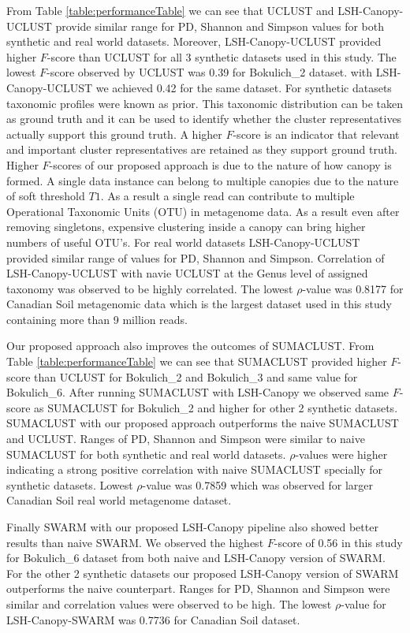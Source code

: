 \documentclass[10pt, conference, compsocconf]{IEEEtran}
\begin{document}
From Table \ref{table:performanceTable} we can see that UCLUST and LSH-Canopy-UCLUST provide similar range for PD, Shannon and Simpson values for both synthetic and real world datasets. Moreover, LSH-Canopy-UCLUST provided higher $F$-score than UCLUST for all 3 synthetic datasets used in this study. The lowest $F$-score observed by UCLUST was 0.39 for Bokulich\_2 dataset. with LSH-Canopy-UCLUST we achieved 0.42 for the same dataset. For synthetic datasets taxonomic profiles were known as prior. This taxonomic distribution can be taken as ground truth and it can be used to identify whether the cluster representatives actually support this ground truth. A higher $F$-score is an indicator that relevant and important cluster representatives are retained as they support ground truth. Higher $F$-scores of our proposed approach is due to the nature of how canopy is formed. A single data instance can belong to multiple canopies due to the nature of soft threshold $T1$. As a result a single read can contribute to multiple Operational Taxonomic Units (OTU) in metagenome data. As a result even after removing singletons, expensive clustering inside a canopy can bring higher numbers of useful OTU's. For real world datasets LSH-Canopy-UCLUST provided similar range of values for PD, Shannon and Simpson. Correlation of LSH-Canopy-UCLUST with navie UCLUST at the Genus level of assigned taxonomy was observed to be highly correlated. The lowest $\rho$-value was 0.8177 for Canadian Soil metagenomic data which is the largest dataset used in this study containing more than 9 million reads.  

Our proposed approach also improves the outcomes of SUMACLUST. From Table \ref{table:performanceTable} we can see that SUMACLUST provided higher $F$-score than UCLUST for Bokulich\_2 and Bokulich\_3 and same value for Bokulich\_6. After running SUMACLUST with LSH-Canopy we observed same $F$-score as SUMACLUST for Bokulich\_2 and higher for other 2 synthetic datasets. SUMACLUST with our proposed approach outperforms the naive SUMACLUST and UCLUST. Ranges of PD, Shannon and Simpson were similar to naive SUMACLUST for both synthetic and real world datasets. $\rho$-values were higher indicating a strong positive correlation with naive SUMACLUST specially for synthetic datasets. Lowest $\rho$-value was 0.7859 which was observed for larger Canadian Soil real world metagenome dataset.

Finally SWARM with our proposed LSH-Canopy pipeline also showed better results than naive SWARM. We observed the highest $F$-score of 0.56 in this study for Bokulich\_6 dataset from both naive and LSH-Canopy version of SWARM. For the other 2 synthetic datasets our proposed LSH-Canopy version of SWARM outperforms the naive counterpart. Ranges for PD, Shannon and Simpson were similar and correlation values were observed to be high. The lowest $\rho$-value for LSH-Canopy-SWARM was 0.7736 for Canadian Soil dataset.          
\end{document}
